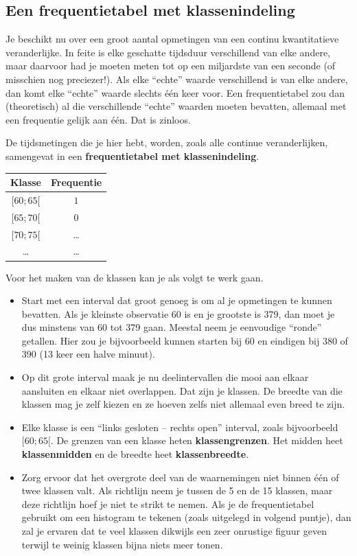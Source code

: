 \documentclass[12pt,twoside]{article}
\begin{document}
\subsection{Een frequentietabel met klassenindeling}

Je beschikt nu over een groot aantal opmetingen van een continu kwantitatieve veranderlijke. In feite is
elke geschatte tijdsduur verschillend van elke andere, maar daarvoor had je moeten meten tot op een
miljardste van een seconde (of misschien nog preciezer!). Als elke “echte” waarde verschillend is
van elke andere, dan komt elke “echte” waarde slechts één keer voor. Een frequentietabel zou dan
(theoretisch) al die verschillende “echte” waarden moeten bevatten, allemaal met een frequentie
gelijk aan één. Dat is zinloos.

De tijdsmetingen die je hier hebt, worden, zoals alle continue veranderlijken, samengevat in een
{\bf frequentietabel met klassenindeling}.

\begin{center}
  \begin{tabular}{|c|c|}
    \hline
    Klasse & Frequentie\\
    \hline
    $[60;65[$ & $1$\\    
    \hline
    $[65;70[$ & $0$\\
    \hline
    $[70;75[$ & \ldots\\ 
    \hline
    \ldots & \ldots\\ 
    \hline
  \end{tabular}
\end{center}

Voor het maken van de klassen kan je als volgt te werk gaan.
\begin{itemize}
  \item Start met een interval dat groot genoeg is om al je opmetingen te kunnen bevatten. Als je
kleinste observatie 60 is en je grootste is 379, dan moet je dus minstens van 60 tot 379 gaan.
Meestal neem je eenvoudige “ronde” getallen. Hier zou je bijvoorbeeld kunnen starten bij 60 en eindigen bij 380 of 390 (13 keer een halve minuut).
  \item Op dit grote interval maak je nu deelintervallen die mooi aan elkaar aansluiten en elkaar niet overlappen. Dat zijn je klassen. De breedte van die klassen mag je zelf kiezen en ze hoeven zelfs niet allemaal even breed te zijn.
  \item Elke klasse is een “links gesloten – rechts open” interval, zoals bijvoorbeeld $[60;65[$. De grenzen van een klasse heten {\bf klassengrenzen}. Het midden heet {\bf klassenmidden} en de breedte heet {\bf klassenbreedte}.
  \item Zorg ervoor dat het overgrote deel van de waarnemingen niet binnen één of twee klassen valt. Als richtlijn neem je tussen de 5 en de 15 klassen, maar deze richtlijn hoef je niet te strikt te nemen. Als je de frequentietabel gebruikt om een histogram te tekenen (zoals uitgelegd in volgend puntje), dan zal je ervaren dat te veel klassen dikwijls een zeer onrustige figuur geven terwijl te weinig klassen bijna niets meer tonen.
\end{itemize}
\end{document}
